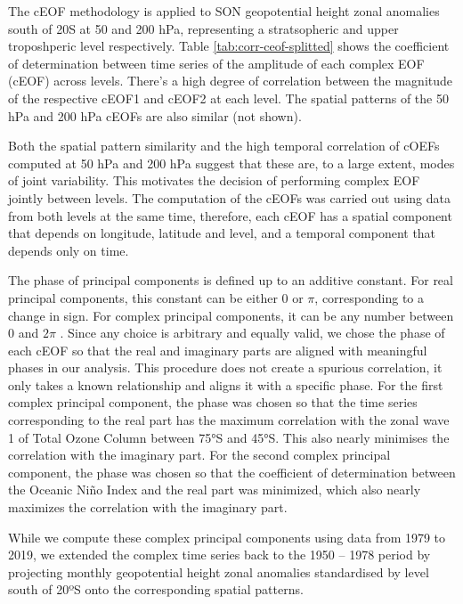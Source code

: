 \documentclass[smallextended]{svjour3}       %
\begin{document}
The cEOF methodology is applied to SON geopotential height zonal anomalies south of 20\degree S at 50 and 200 hPa, representing a stratsopheric and upper troposhperic level respectively.
Table \ref{tab:corr-ceof-splitted} shows the coefficient of determination between time series of the amplitude of each complex EOF (cEOF) across levels.
There's a high degree of correlation between the magnitude of the respective cEOF1 and cEOF2 at each level.
The spatial patterns of the 50 hPa and 200 hPa cEOFs are also similar (not shown).

Both the spatial pattern similarity and the high temporal correlation of cOEFs computed at 50 hPa and 200 hPa suggest that these are, to a large extent, modes of joint variability.
This motivates the decision of performing complex EOF jointly between levels.
The computation of the cEOFs was carried out using data from both levels at the same time, therefore, each cEOF has a spatial component that depends on longitude, latitude and level, and a temporal component that depends only on time.

The phase of principal components is defined up to an additive constant.
For real principal components, this constant can be either 0 or \(\pi\), corresponding to a change in sign.
For complex principal components, it can be any number between 0 and \(2\pi\) \citep{horel1984}.
Since any choice is arbitrary and equally valid, we chose the phase of each cEOF so that the real and imaginary parts are aligned with meaningful phases in our analysis.
This procedure does not create a spurious correlation, it only takes a known relationship and aligns it with a specific phase.
For the first complex principal component, the phase was chosen so that the time series corresponding to the real part has the maximum correlation with the zonal wave 1 of Total Ozone Column between 75°S and 45°S.
This also nearly minimises the correlation with the imaginary part.
For the second complex principal component, the phase was chosen so that the coefficient of determination between the Oceanic Niño Index \citep{bamston1997} and the real part was minimized, which also nearly maximizes the correlation with the imaginary part.



While we compute these complex principal components using data from 1979 to 2019, we extended the complex time series back to the 1950 -- 1978 period by projecting monthly geopotential height zonal anomalies standardised by level south of 20ºS onto the corresponding spatial patterns.
\end{document}
